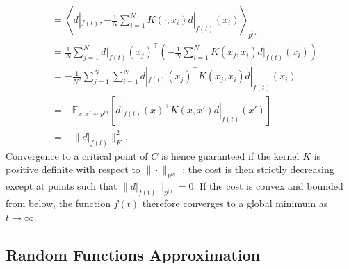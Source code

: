 \documentclass[10pt]{article}
\newcommand{\EE}{\mathbb{E}}
\newcommand{\inner}[2]{\left\langle #1, #2 \right\rangle}
\newcommand{\pin}{{p^{in}}}
\begin{document}
\begin{itemize}
\begin{align*}
&= \inner{d|_{f(t)}}{-\frac{1}{N} \sum_{i = 1}^N K(\cdot,x_i) d|_{f(t)}(x_i)}_\pin \\
&= \frac{1}{N} \sum_{j = 1}^N d|_{f(t)}(x_j)^\top \left( -\frac{1}{N} \sum_{i = 1}^N K(x_j,x_i) d|_{f(t)}(x_i) \right) \\
&= -\frac{1}{N^2} \sum_{j = 1}^N \sum_{i = 1}^N d|_{f(t)}(x_j)^\top K(x_j,x_i) d|_{f(t)}(x_i) \\
&= - \EE_{x,x' \sim \pin} [d|_{f(t)}(x)^\top K(x,x') d|_{f(t)}(x')] \\
&= - \| d|_{f(t)} \|_K^2.
\end{align*}
Convergence to a critical point of $C$ is hence guaranteed if the kernel $K$ is positive definite with respect to $\|\cdot\|_{\pin}$ : the cost is then strictly decreasing except at points such that $\|d|_{f(t)}\|_{\pin} = 0$. If the cost is convex and bounded from below, the function $f(t)$ therefore converges to a global minimum as $t \rightarrow \infty$.
\end{itemize}

\newpage

\subsection{Random Functions Approximation}
\end{document}
